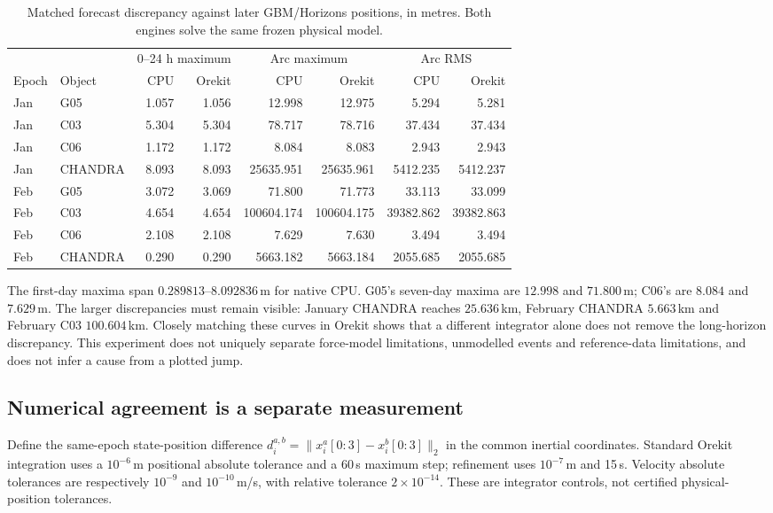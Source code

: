 \begin{table}[htbp]
\centering\small\setlength{\tabcolsep}{3pt}
\begin{tabular}{llrrrrrr}
\toprule
 & & \multicolumn{2}{c}{0--24 h maximum} & \multicolumn{2}{c}{Arc maximum} & \multicolumn{2}{c}{Arc RMS}\\
Epoch & Object & CPU & Orekit & CPU & Orekit & CPU & Orekit\\
\midrule
Jan & G05 & 1.057 & 1.056 & 12.998 & 12.975 & 5.294 & 5.281\\
Jan & C03 & 5.304 & 5.304 & 78.717 & 78.716 & 37.434 & 37.434\\
Jan & C06 & 1.172 & 1.172 & 8.084 & 8.083 & 2.943 & 2.943\\
Jan & CHANDRA & 8.093 & 8.093 & 25635.951 & 25635.961 & 5412.235 & 5412.237\\
Feb & G05 & 3.072 & 3.069 & 71.800 & 71.773 & 33.113 & 33.099\\
Feb & C03 & 4.654 & 4.654 & 100604.174 & 100604.175 & 39382.862 & 39382.863\\
Feb & C06 & 2.108 & 2.108 & 7.629 & 7.630 & 3.494 & 3.494\\
Feb & CHANDRA & 0.290 & 0.290 & 5663.182 & 5663.184 & 2055.685 & 2055.685\\
\bottomrule
\end{tabular}
\caption{Matched forecast discrepancy against later GBM/Horizons positions,
in metres. Both engines solve the same frozen physical model.}
\label{tab:r18-orbit-errors}
\end{table}

The first-day maxima span $0.289813$--$8.092836$\,m for native CPU. G05's
seven-day maxima are $12.998$ and $71.800$\,m; C06's are $8.084$ and
$7.629$\,m. The larger discrepancies must remain visible: January CHANDRA
reaches $25.636$\,km, February CHANDRA $5.663$\,km and February C03
$100.604$\,km. Closely matching these curves in Orekit shows that a different
integrator alone does not remove the long-horizon discrepancy. This experiment
does not uniquely separate force-model limitations, unmodelled events and
reference-data limitations, and does not infer a cause from a plotted jump.

\subsection{Numerical agreement is a separate measurement}
Define the same-epoch state-position difference
$d_i^{a,b}=\lVert x_i^a[0{:}3]-x_i^b[0{:}3]\rVert_2$ in the common inertial
coordinates. Standard Orekit integration uses a $10^{-6}$\,m positional
absolute tolerance and a 60\,s maximum step; refinement uses $10^{-7}$\,m
and 15\,s. Velocity absolute tolerances are respectively $10^{-9}$ and
$10^{-10}$\,m/s, with relative tolerance $2\times10^{-14}$. These are
integrator controls, not certified physical-position tolerances.

